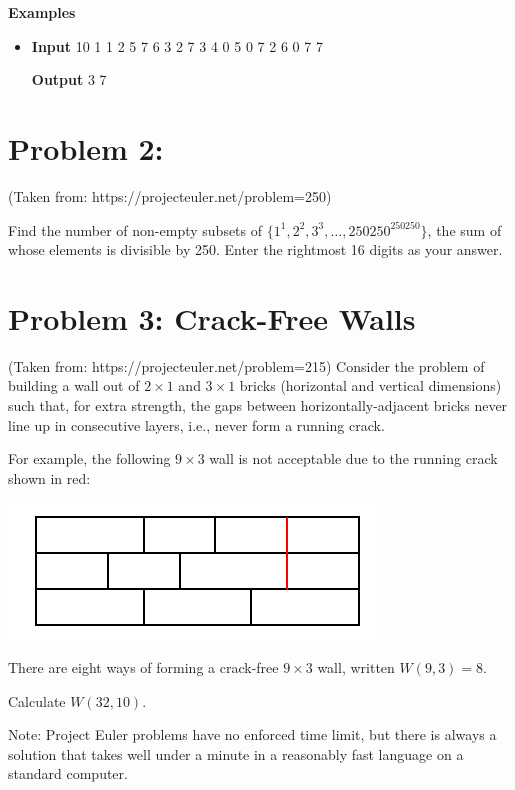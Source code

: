 \normalfont\documentclass[letterpaper,11pt]{article}
\begin{document}
\textbf{Examples}
\begin{itemize}
\item \textbf{Input}  10  1 1  2 5  7 6  3 2  7 3  4 0  5 0  7 2  6 0  7 7

\textbf{Output}    3 7
\end{itemize}

\newpage


\section*{Problem 2:}
(Taken from: https://projecteuler.net/problem=250) \newline

Find the number of non-empty subsets of $\{1^1, 2^2, 3^3, \ldots, 250250^{250250}\}$, the sum of whose elements is divisible by 250. Enter the rightmost 16 digits as your answer.



\section*{Problem 3: Crack-Free Walls}
(Taken from: https://projecteuler.net/problem=215) \newline
Consider the problem of building a wall out of $2 \times 1$ and $3 \times 1$ bricks (horizontal and vertical dimensions) such that, for extra strength, the gaps between horizontally-adjacent bricks never line up in consecutive layers, i.e., never form a running crack.

For example, the following $9 \times 3$ wall is not acceptable due to the running crack shown in red:

\includegraphics{PE215_fig.png}

There are eight ways of forming a crack-free $9 \times 3$ wall, written $W(9,3) = 8$.

Calculate $W(32,10)$.

Note: Project Euler problems have no enforced time limit, but there is always a solution that takes well under a minute in a reasonably fast language on a standard computer.
\end{document}
